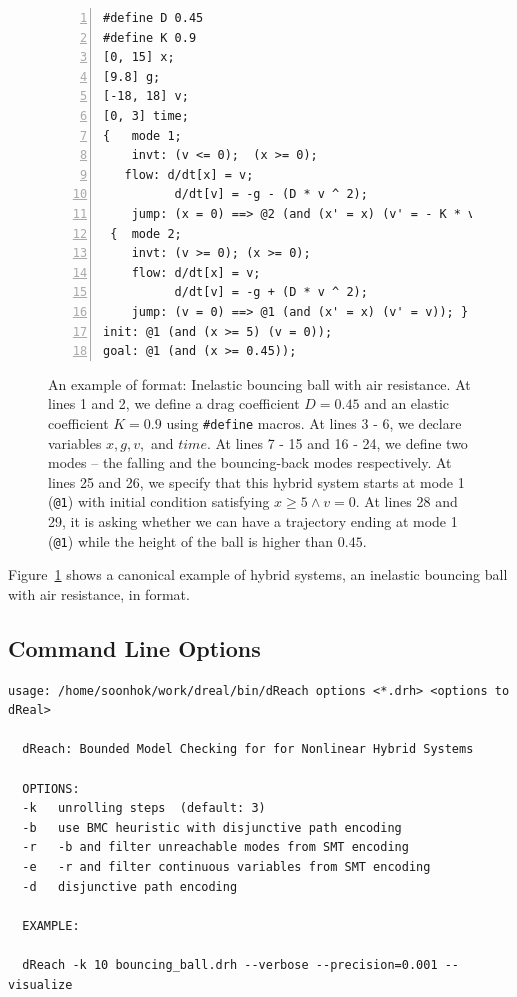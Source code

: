 \begin{figure}
  \centering
  \begin{Verbatim}[fontfamily=courier, frame=single, framesep=1mm,
  numbers=left, fontsize=\scriptsize]
#define D 0.45
#define K 0.9
[0, 15] x;
[9.8] g;
[-18, 18] v;
[0, 3] time;
{   mode 1;
    invt: (v <= 0);  (x >= 0);
   flow: d/dt[x] = v;
          d/dt[v] = -g - (D * v ^ 2);
    jump: (x = 0) ==> @2 (and (x' = x) (v' = - K * v)); }
 {  mode 2;
    invt: (v >= 0); (x >= 0);
    flow: d/dt[x] = v;
          d/dt[v] = -g + (D * v ^ 2);
    jump: (v = 0) ==> @1 (and (x' = x) (v' = v)); }
init: @1 (and (x >= 5) (v = 0));
goal: @1 (and (x >= 0.45));
\end{Verbatim}
\caption{An example of \drh{} format: Inelastic bouncing ball with air
  resistance. At lines 1 and 2, we define a drag coefficient $D = 0.45$
  and an elastic coefficient $K = 0.9$ using \texttt{\#define} macros.
  At lines 3 - 6, we declare variables $x, g, v,$ and $time$. At lines
  7 - 15 and 16 - 24, we define two modes -- the falling and the
  bouncing-back modes respectively. At lines 25 and 26, we specify
  that this hybrid system starts at mode 1 (\texttt{@1}) with initial
  condition satisfying $x \ge 5 \land v = 0$. At lines 28 and 29, it
  is asking whether we can have a trajectory ending at mode 1
  (\texttt{@1}) while the height of the ball is higher than $0.45$.}
\label{fig:bouncing-ball-drh}
\end{figure}

Figure~\ref{fig:bouncing-ball-drh} shows a canonical example of hybrid
systems, an inelastic bouncing ball with air resistance, in \drh{}
format.

\subsection{Command Line Options}

\begin{Verbatim}[fontfamily=courier, frame=single, framesep=1mm, fontsize=\scriptsize]
  usage: /home/soonhok/work/dreal/bin/dReach options <*.drh> <options to dReal>

  dReach: Bounded Model Checking for for Nonlinear Hybrid Systems

  OPTIONS:
  -k   unrolling steps  (default: 3)
  -b   use BMC heuristic with disjunctive path encoding
  -r   -b and filter unreachable modes from SMT encoding
  -e   -r and filter continuous variables from SMT encoding
  -d   disjunctive path encoding

  EXAMPLE:

  dReach -k 10 bouncing_ball.drh --verbose --precision=0.001 --visualize

\end{Verbatim}

